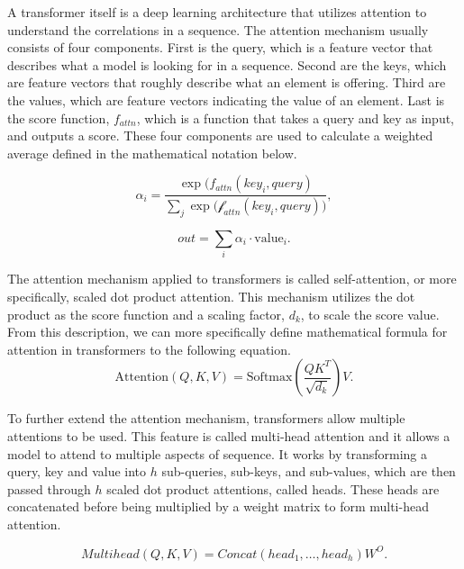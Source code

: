 \documentclass[peerreview]{IEEEtran}
\begin{document}
A transformer itself is a deep learning architecture that utilizes attention to understand the correlations in a sequence. The attention mechanism usually consists of four components. First is the query, which is a feature vector that describes what a model is looking for in a sequence. Second are the keys, which are feature vectors that roughly describe what an element is offering. Third are the values, which are feature vectors indicating the value of an element. Last is the score function, $f_{attn}$, which is a function that takes a query and key as input, and outputs a score. These four components are used to calculate a weighted average defined in the mathematical notation below.

$$
\alpha_i = \frac{\exp\mathcal({f}_{attn}(key_i, query)}{\sum_j{\exp(\mathcal{f}_{attn}(key_i, query)})}, 
$$

$$
out=\sum_i{\alpha_i \cdot \text{value}_i}.
$$

The attention mechanism applied to transformers is called self-attention, or more specifically, scaled dot product attention. This mechanism utilizes the dot product as the score function and a scaling factor, $d_k$, to scale the score value. From this description, we can more specifically define mathematical formula for attention in transformers to the following equation.
$$
\textrm{Attention}(Q, K, V) = \textrm{Softmax}(\frac{QK^T}{\sqrt{d_k}})V.
$$

To further extend the attention mechanism, transformers allow multiple attentions to be used. This feature is called multi-head attention and it allows a model to attend to multiple aspects of sequence. It works by transforming a query, key and value into $h$ sub-queries, sub-keys, and sub-values, which are then passed through $h$ scaled dot product attentions, called heads. These heads are concatenated before being multiplied by a weight matrix to form multi-head attention. 

$$
Multihead(Q, K, V) = Concat(head_1, \dots, head_h)W^O.
$$
\end{document}
